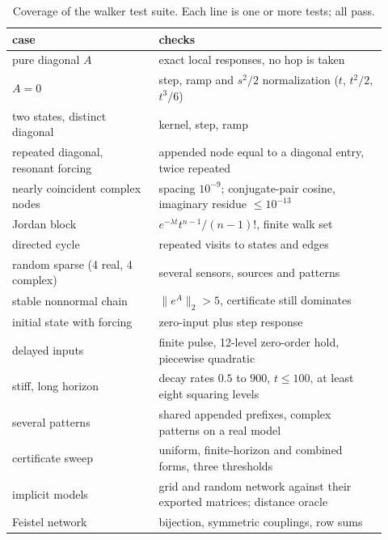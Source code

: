 \begin{table}[h]
\caption{Coverage of the walker test suite. Each line is one or more tests; all pass.}\label{tab:tests}
\begin{ruledtabular}
\footnotesize
\begin{tabular}{p{0.36\linewidth}p{0.56\linewidth}}
case & checks\\\hline
pure diagonal $A$ & exact local responses, no hop is taken\\
$A=0$ & step, ramp and $s^2/2$ normalization ($t$, $t^2/2$, $t^3/6$)\\
two states, distinct diagonal & kernel, step, ramp\\
repeated diagonal, resonant forcing & appended node equal to a diagonal entry, twice repeated\\
nearly coincident complex nodes & spacing $10^{-9}$; conjugate-pair cosine, imaginary residue $\le10^{-13}$\\
Jordan block & $e^{-\lambda t}t^{n-1}/(n-1)!$, finite walk set\\
directed cycle & repeated visits to states and edges\\
random sparse (4 real, 4 complex) & several sensors, sources and patterns\\
stable nonnormal chain & $\|e^{A}\|_2>5$, certificate still dominates\\
initial state with forcing & zero-input plus step response\\
delayed inputs & finite pulse, 12-level zero-order hold, piecewise quadratic\\
stiff, long horizon & decay rates $0.5$ to $900$, $t\le100$, at least eight squaring levels\\
several patterns & shared appended prefixes, complex patterns on a real model\\
certificate sweep & uniform, finite-horizon and combined forms, three thresholds\\
implicit models & grid and random network against their exported matrices; distance oracle\\
Feistel network & bijection, symmetric couplings, row sums\\
\end{tabular}
\end{ruledtabular}
\end{table}
